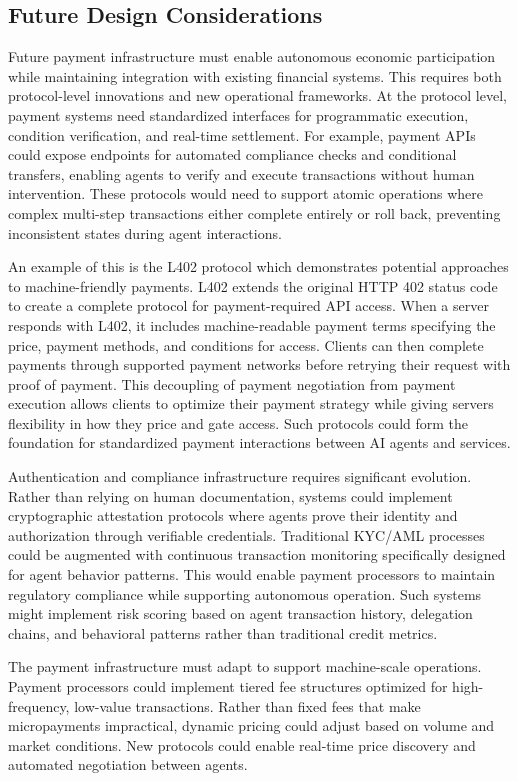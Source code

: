 \documentclass{article}
\begin{document}
\subsection{Future Design Considerations}
\label{subsec:payments_future}
Future payment infrastructure must enable autonomous economic participation while maintaining integration with existing financial systems. This requires both protocol-level innovations and new operational frameworks. At the protocol level, payment systems need standardized interfaces for programmatic execution, condition verification, and real-time settlement. For example, payment APIs could expose endpoints for automated compliance checks and conditional transfers, enabling agents to verify and execute transactions without human intervention. These protocols would need to support atomic operations where complex multi-step transactions either complete entirely or roll back, preventing inconsistent states during agent interactions.

An example of this is the L402 protocol which demonstrates potential approaches to machine-friendly payments. L402 extends the original HTTP 402 status code to create a complete protocol for payment-required API access. When a server responds with L402, it includes machine-readable payment terms specifying the price, payment methods, and conditions for access. Clients can then complete payments through supported payment networks before retrying their request with proof of payment. This decoupling of payment negotiation from payment execution allows clients to optimize their payment strategy while giving servers flexibility in how they price and gate access. Such protocols could form the foundation for standardized payment interactions between AI agents and services.

Authentication and compliance infrastructure requires significant evolution. Rather than relying on human documentation, systems could implement cryptographic attestation protocols where agents prove their identity and authorization through verifiable credentials. Traditional KYC/AML processes could be augmented with continuous transaction monitoring specifically designed for agent behavior patterns. This would enable payment processors to maintain regulatory compliance while supporting autonomous operation. Such systems might implement risk scoring based on agent transaction history, delegation chains, and behavioral patterns rather than traditional credit metrics.

The payment infrastructure must adapt to support machine-scale operations. Payment processors could implement tiered fee structures optimized for high-frequency, low-value transactions. Rather than fixed fees that make micropayments impractical, dynamic pricing could adjust based on volume and market conditions. New protocols could enable real-time price discovery and automated negotiation between agents.
\end{document}
